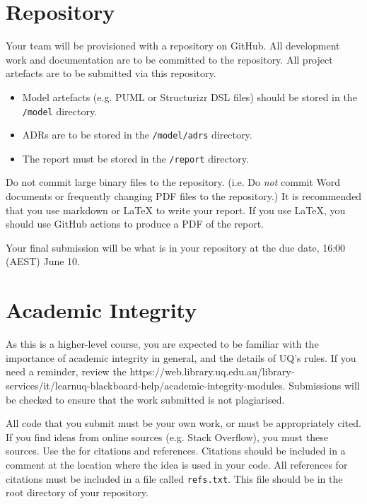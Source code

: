 \documentclass{csse4400}
\begin{document}
\section{Repository}
Your team will be provisioned with a repository on GitHub.
All development work and documentation are to be committed to the repository.
All project artefacts are to be submitted via this repository.

\begin{itemize}
    \item Model artefacts (e.g. PUML or Structurizr DSL files) should be stored in the \texttt{/model} directory.
    \item ADRs are to be stored in the \texttt{/model/adrs} directory.
    \item The report must be stored in the \texttt{/report} directory.
\end{itemize}

Do not commit large binary files to the repository.
(i.e. Do \emph{not} commit Word documents or frequently changing PDF files to the repository.)
It is recommended that you use markdown or LaTeX to write your report.
If you use LaTeX, you should use GitHub actions to produce a PDF of the report.

Your final submission will be what is in your repository at the due date, 16:00 (AEST) June 10.


\section{Academic Integrity}
As this is a higher-level course, you are expected to be familiar with the importance of academic integrity in general, and the details of UQ's rules.
If you need a reminder, review the 
{https://web.library.uq.edu.au/library-services/it/learnuq-blackboard-help/academic-integrity-modules}.
Submissions will be checked to ensure that the work submitted is not plagiarised.

All code that you submit must be your own work, or must be appropriately cited.
If you find ideas from online sources (e.g. Stack Overflow), you must  these sources.
Use the  for citations and references.
Citations should be included in a comment at the location where the idea is used in your code.
All references for citations must be included in a file called \texttt{refs.txt}.
This file should be in the root directory of your repository.
\end{document}
